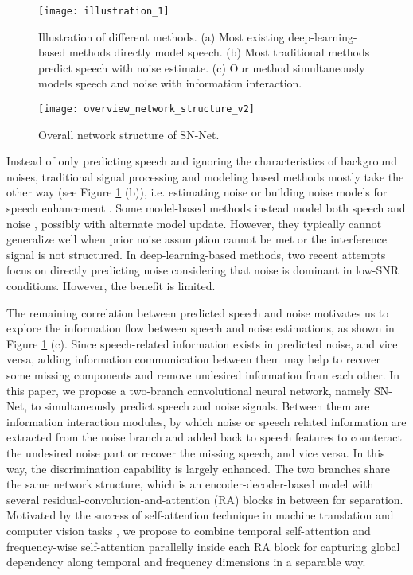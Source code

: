 \documentclass[letterpaper]{article} \usepackage{snnet}  \usepackage{times}  \usepackage{helvet} \usepackage{courier}  \usepackage[hyphens]{url}  \usepackage{graphicx} \urlstyle{rm} \def\UrlFont{\rm}  \usepackage{graphicx}  \usepackage{natbib}  \usepackage{caption} \usepackage{amsfonts}  \usepackage{amsmath}  \usepackage{multirow} \usepackage{tablefootnote}  \usepackage[switch]{lineno}
\begin{document}
\begin{figure}[t]
    \centering
    \texttt{[image: illustration\_1]}
    \caption{Illustration of different methods. (a) Most existing deep-learning-based methods directly model speech. (b) Most traditional methods predict speech with noise estimate. (c) Our method simultaneously models speech and noise with information interaction.}
    \label{fig0}
\end{figure}

\begin{figure*}[t]
    \centering
    \texttt{[image: overview\_network\_structure\_v2]} \caption{Overall network structure of SN-Net.}
    \label{fig1}
\end{figure*}

Instead of only predicting speech and ignoring the characteristics of background noises, traditional signal processing and modeling based methods mostly take the other way (see Figure \ref{fig0} (b)), i.e. estimating noise or building noise models for speech enhancement \cite{boll1979suppression, hendriks2010noisePSD, wang2017model, wilson2008NMF1, moham2013NMF2}. Some model-based methods instead model both speech and noise \cite{srinivasan2006Codebook, srinivasan2005Codebook}, possibly with alternate model update. However, they typically cannot generalize well when prior noise assumption cannot be met or the interference signal is not structured. In deep-learning-based methods, two recent attempts \cite{odelowo2017noise, odelowo2018study} focus on directly predicting noise considering that noise is dominant in low-SNR conditions. However, the benefit is limited.



The remaining correlation between predicted speech and noise motivates us to explore the information flow between speech and noise estimations, as shown in Figure \ref{fig0} (c). Since speech-related information exists in predicted noise, and vice versa, adding information communication between them may help to recover some missing components and remove undesired information from each other. In this paper, we propose a two-branch convolutional neural network, namely SN-Net, to simultaneously predict speech and noise signals. Between them are information interaction modules, by which noise or speech related information are extracted from the noise branch and added back to speech features to counteract the undesired noise part or recover the missing speech, and vice versa. In this way, the discrimination capability is largely enhanced. The two branches share the same network structure, which is an encoder-decoder-based model with several residual-convolution-and-attention (RA) blocks in between for separation. Motivated by the success of self-attention technique in machine translation and computer vision tasks \cite{vaswani2017attention, wang2018nonlocal}, we propose to combine temporal self-attention and frequency-wise self-attention parallelly inside each RA block for capturing global dependency along temporal and frequency dimensions in a separable way.
\end{document}

